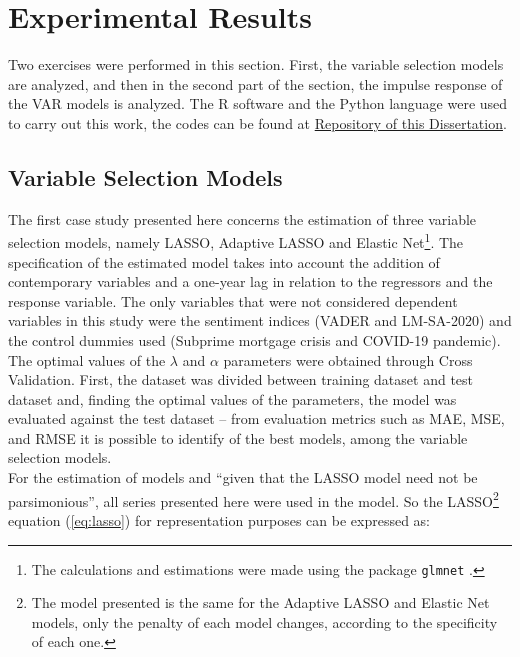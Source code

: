\section{Experimental Results} \label{sec:expresults}

Two exercises were performed in this section. First, the variable selection models are analyzed, and then in the second part of the section, the impulse response of the VAR models is analyzed. The R software and the Python language \cite[]{van1995python} were used to carry out this work, the codes can be found at \href{https://github.com/gustavovital/Dissertation}{Repository of this Dissertation}.\\

\subsection{Variable Selection Models}

The first case study presented here concerns the estimation of three variable selection models, namely LASSO, Adaptive LASSO and Elastic Net\footnote{The calculations and estimations were made using the package \texttt{glmnet} \cite[] {glmnet2011noah}.}. The specification of the estimated model takes into account the addition of contemporary variables and a one-year lag in relation to the regressors and the response variable. The only variables that were not considered dependent variables in this study were the sentiment indices (VADER and LM-SA-2020) and the control dummies used (Subprime mortgage crisis and COVID-19 pandemic).\\

The optimal values of the $\lambda$ and $\alpha$ parameters were obtained through Cross Validation. First, the dataset was divided between training dataset and test dataset and, finding the optimal values of the parameters, the model was evaluated against the test dataset -- from evaluation metrics such as MAE, MSE, and RMSE it is possible to identify of the best models, among the variable selection models.\\

For the estimation of models and ``given that the LASSO model need not be parsimonious''\cite[p. 25]{shapiro2020measuring}, all series presented here were used in the model. So the LASSO\footnote{The model presented is the same for the Adaptive LASSO and Elastic Net models, only the penalty of each model changes, according to the specificity of each one.} equation (\ref{eq:lasso}) for representation purposes can be expressed as:

